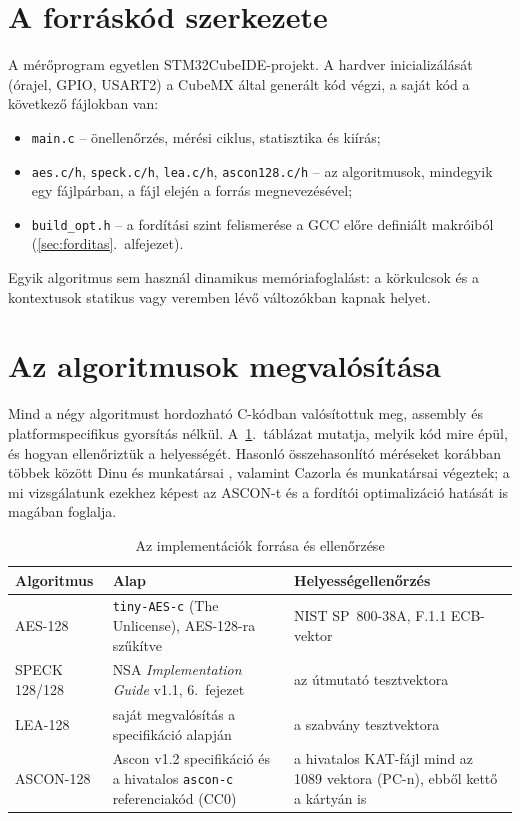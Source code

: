 \documentclass[a4paper,12pt]{report}
\theoremstyle{definition}
\theoremstyle{remark}
\begin{document}
\section{A forráskód szerkezete}

A mérőprogram egyetlen STM32CubeIDE-projekt. A hardver inicializálását (órajel, GPIO, USART2) a CubeMX által generált kód végzi, a saját kód a következő fájlokban van:

\begin{itemize}
	\item \texttt{main.c} -- önellenőrzés, mérési ciklus, statisztika és kiírás;
	\item \texttt{aes.c/h}, \texttt{speck.c/h}, \texttt{lea.c/h}, \texttt{ascon128.c/h} -- az algoritmusok, mindegyik egy fájlpárban, a fájl elején a forrás megnevezésével;
	\item \texttt{build\_opt.h} -- a fordítási szint felismerése a GCC előre definiált makróiból (\ref{sec:forditas}.~alfejezet).
\end{itemize}

Egyik algoritmus sem használ dinamikus memóriafoglalást: a körkulcsok és a kontextusok statikus vagy veremben lévő változókban kapnak helyet.

\section{Az algoritmusok megvalósítása}\label{sec:megvalositas}

Mind a négy algoritmust hordozható C-kódban valósítottuk meg, assembly és platformspecifikus gyorsítás nélkül. A~\ref{tab:forrasok}.~táblázat mutatja, melyik kód mire épül, és hogyan ellenőriztük a helyességét. Hasonló összehasonlító méréseket korábban többek között Dinu és munkatársai \cite{Dinu2015}, valamint Cazorla és munkatársai \cite{Cazorla2013} végeztek; a mi vizsgálatunk ezekhez képest az ASCON-t és a fordítói optimalizáció hatását is magában foglalja.

\begin{table}[htbp]
    \centering
    \small
    \caption{Az implementációk forrása és ellenőrzése}
    \label{tab:forrasok}
    \begin{tabularx}{\textwidth}{|l|X|X|}
        \hline
        \textbf{Algoritmus} & \textbf{Alap} & \textbf{Helyességellenőrzés} \\ \hline
        AES-128 & \texttt{tiny-AES-c} \cite{TinyAES} (The Unlicense), AES-128-ra szűkítve & NIST SP~800-38A, F.1.1 ECB-vektor \cite{SP80038A} \\ \hline
        SPECK 128/128 & NSA \emph{Implementation Guide} v1.1, 6.~fejezet \cite{Beaulieu2019} & az útmutató tesztvektora \\ \hline
        LEA-128 & saját megvalósítás a specifikáció alapján \cite{Hong2013,Lee2014} & a szabvány tesztvektora \cite{KISALEA} \\ \hline
        ASCON-128 & Ascon v1.2 specifikáció \cite{Dobraunig2021} és a hivatalos \texttt{ascon-c} referenciakód \cite{AsconC} (CC0) & a hivatalos KAT-fájl mind az 1089 vektora (PC-n), ebből kettő a kártyán is \\ \hline
    \end{tabularx}
\end{table}
\end{document}
